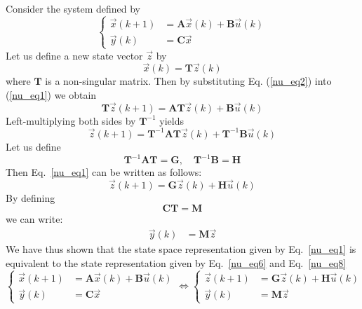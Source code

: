 \documentclass[11pt,a4paper,oneside]{book}
\numberwithin{equation}{section}
\theoremstyle{it}
\theoremstyle{definition}
\begin{document}
Consider the  system defined by
\begin{equation}\label{nu_eq1}
	\left\lbrace \begin{aligned}
		\vec{x}(k+1) & = \mathbf{A}\vec{x}(k) + \mathbf{B}\vec{u}(k) \\[6pt]
		\vec{y}(k) & = \mathbf{C}\vec{x}
	\end{aligned}\right. 
\end{equation}
Let us define a new state vector ${\vec{z}}$ by
\begin{equation}\label{nu_eq2}
	{\vec{x}}(k) = \mathbf{T}{\vec{z}}(k)
\end{equation}
where $\mathbf{T}$ is a non-singular matrix. Then by substituting Eq. 
(\ref{nu_eq2}) into (\ref{nu_eq1}) we obtain
\begin{equation}\label{nu_eq3}
	\mathbf{T}{\vec{z}}(k+1) = \mathbf{A}\mathbf{T}{\vec{z}}(k)+ 
	\mathbf{B}\vec{u}(k)
\end{equation}
Left-multiplying both sides by $\mathbf{T}^{-1}$ yields
\begin{equation}\label{nu_eq4}
	{\vec{z}}(k+1) = \mathbf{T}^{-1}\mathbf{A}\mathbf{T}{\vec{z}}(k)+ 
	\mathbf{T}^{-1}\mathbf{B}\vec{u}(k)
\end{equation}
Let us define
\begin{equation*}\label{nu_eq5}
	\mathbf{T}^{-1}\mathbf{A}\mathbf{T} = {\mathbf{G}}, \quad 
	\mathbf{T}^{-1}\mathbf{B} = {\mathbf{H}}
\end{equation*}
Then Eq.~\eqref{nu_eq1} can be written as follows:
\begin{equation}\label{nu_eq6}
	{\vec{z}}(k+1) = {\mathbf{G}}{\vec{z}}(k)+ {\mathbf{H}}\vec{u}(k)
\end{equation}
By defining 
\begin{equation*}\label{nu_eq7}
	\mathbf{C}\mathbf{T} = {\mathbf{M}}
\end{equation*}
we can write:
\begin{equation}\label{nu_eq8}
	\begin{aligned}
		{\vec{y}}(k) & = \mathbf{M}{\vec{z}}
	\end{aligned}
\end{equation}
We have thus shown that the state space representation given by 
Eq.~\eqref{nu_eq1} is equivalent to the state representation given by 
Eq.~\eqref{nu_eq6} and Eq.~\eqref{nu_eq8}
\begin{equation}\label{nu_eq9}
	\left\{\begin{aligned}
		\vec{x}(k+1) & = \mathbf{A}\vec{x}(k) + \mathbf{B}\vec{u}(k) \\[6pt]
		\vec{y}(k) & = \mathbf{C}\vec{x}
	\end{aligned}\right. \iff
	\left\{\begin{aligned}
		{\vec{z}}(k+1) & = {\mathbf{G}}{\vec{z}}(k) + {\mathbf{H}}{\vec{u}}(k) 
		\\[6pt]
		\vec{y}(k) & = {\mathbf{M}}{\vec{z}}
	\end{aligned}\right.
\end{equation}
\end{document}
